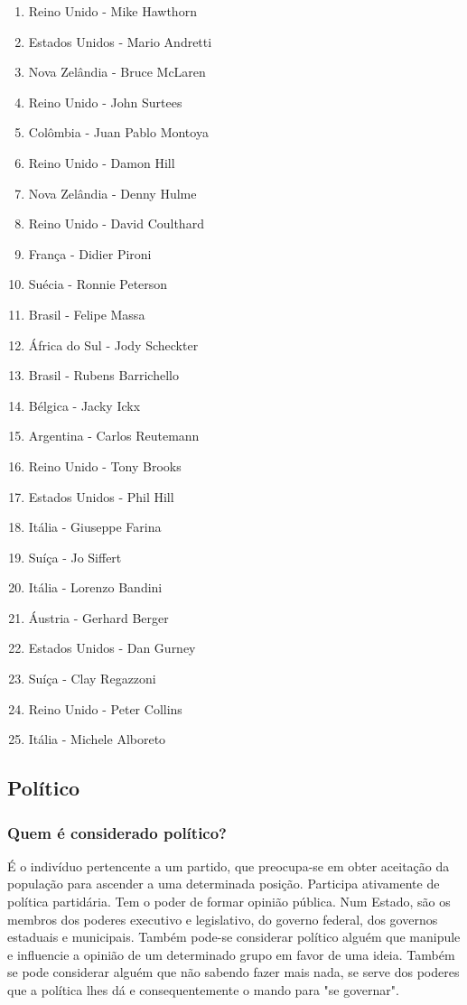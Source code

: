 \documentclass[a4paper,10pt]{article}
\begin{document}
\begin{itemize}
\begin{enumerate}
\item Reino Unido - Mike Hawthorn
\item Estados Unidos - Mario Andretti
\item Nova Zelândia - Bruce McLaren
\item Reino Unido - John Surtees
\item Colômbia - Juan Pablo Montoya
\item Reino Unido - Damon Hill
\item Nova Zelândia - Denny Hulme
\item Reino Unido - David Coulthard
\item França - Didier Pironi
\item Suécia - Ronnie Peterson
\item Brasil - Felipe Massa
\item África do Sul - Jody Scheckter
\item Brasil - Rubens Barrichello
\item Bélgica - Jacky Ickx
\item Argentina - Carlos Reutemann
\item Reino Unido - Tony Brooks
\item Estados Unidos - Phil Hill
\item Itália - Giuseppe Farina
\item Suíça - Jo Siffert
\item Itália - Lorenzo Bandini
\item Áustria - Gerhard Berger
\item Estados Unidos - Dan Gurney
\item Suíça - Clay Regazzoni
\item Reino Unido - Peter Collins
\item Itália - Michele Alboreto
\end{enumerate}

\end{itemize}


\subsection{Político}
\subsubsection{Quem é considerado político?}
É o indivíduo pertencente a um partido, que preocupa-se em obter aceitação da população para ascender a uma determinada posição. Participa ativamente de política partidária. Tem o poder de formar opinião pública. Num Estado, são os membros dos poderes executivo e legislativo, do governo federal, dos governos estaduais e municipais. Também pode-se considerar político alguém que manipule e influencie a opinião de um determinado grupo em favor de uma ideia. Também se pode considerar alguém que não sabendo fazer mais nada, se serve dos poderes que a política lhes dá e consequentemente o mando para "se governar".
\end{document}
